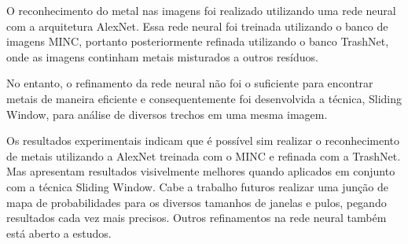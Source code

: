 \documentclass[conference, compsoc, 12pt]{IEEEtran}
\begin{document}
O reconhecimento do metal nas imagens foi realizado utilizando uma rede neural com a arquitetura AlexNet. Essa rede neural foi treinada utilizando o banco de imagens MINC, portanto posteriormente refinada utilizando o banco TrashNet, onde as imagens continham metais misturados a outros resíduos.

No entanto, o refinamento da rede neural não foi o suficiente para encontrar metais de maneira eficiente e consequentemente foi desenvolvida a técnica, Sliding Window, para análise de diversos trechos em uma mesma imagem.

Os resultados experimentais indicam que é possível sim realizar o reconhecimento de metais utilizando a AlexNet treinada com o MINC e refinada com a TrashNet. Mas apresentam resultados visivelmente melhores quando aplicados em conjunto com a técnica Sliding Window. Cabe a trabalho futuros realizar uma junção de mapa de probabilidades para os diversos tamanhos de janelas e pulos, pegando resultados cada vez mais precisos. Outros refinamentos na rede neural também está aberto a estudos.


\end{document}

